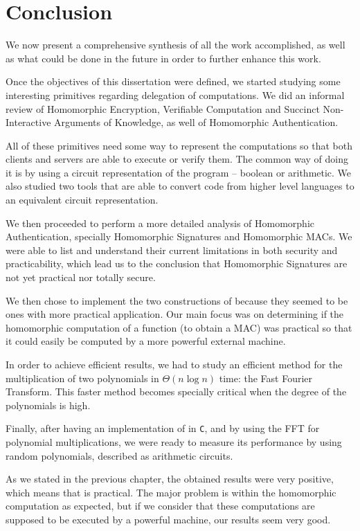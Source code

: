 \chapter{Conclusion}\label{chap:conclusion}
We now present a comprehensive synthesis of all the work accomplished, as well
as what could be done in the future in order to further enhance this work.

Once the objectives of this dissertation were defined, we started studying some
interesting primitives regarding delegation of computations. We did an informal
review of Homomorphic Encryption, Verifiable Computation and Succinct
Non-Interactive Arguments of Knowledge, as well of Homomorphic Authentication.

All of these primitives need some way to represent the computations so that
both clients and servers are able to execute or verify them. The common way of
doing it is by using a circuit representation of the program -- boolean or
arithmetic. We also studied two tools that are able to convert code from higher
level languages to an equivalent circuit representation.

We then proceeded to perform a more detailed analysis of Homomorphic
Authentication, specially Homomorphic Signatures and Homomorphic MACs. We were
able to list and understand their current limitations in both security and
practicability, which lead us to the conclusion that Homomorphic Signatures are
not yet practical nor totally secure.

We then chose to implement the two constructions of
\textcite{catalano:fiore:2013} because they seemed to be ones with more
practical application. Our main focus was on determining if the homomorphic
computation of a function (to obtain a MAC) was practical so that it could
easily be computed by a more powerful external machine.

In order to achieve efficient results, we had to study an efficient method for
the multiplication of two polynomials in $\Theta(n \log{n})$ time: the Fast
Fourier Transform. This faster method becomes specially critical when the
degree of the polynomials is high.

Finally, after having an implementation of \textcite{catalano:fiore:2013} in
\texttt{C}, and by using the FFT for polynomial multiplications, we were ready
to measure its performance by using random polynomials, described as arithmetic
circuits.

As we stated in the previous chapter, the obtained results were very positive,
which means that \textcite{catalano:fiore:2013} is practical. The major problem
is within the homomorphic computation as expected, but if we consider that these
computations are supposed to be executed by a powerful machine, our results
seem very good.

